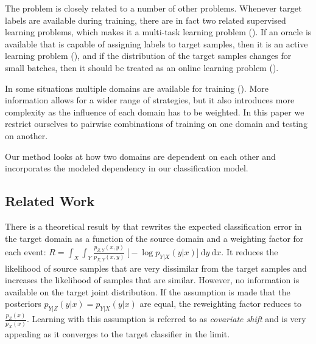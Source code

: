 \documentclass[twoside,11pt]{article}
\begin{document}
The problem is closely related to a number of other problems. Whenever target labels are available during training, there are in fact two related supervised learning problems, which makes it a multi-task learning problem (\citealp{pan2010survey, moreno2012unifying}). If an oracle is available that is capable of assigning labels to target samples, then it is an active learning problem (\citealp{cohn1996active}), and if the distribution of the target samples changes for small batches, then it should be treated as an online learning problem (\citealp{ma2009identifying}). 

In some situations multiple domains are available for training (\citealp{mansour2009domaina}). More information allows for a wider range of strategies, but it also introduces more complexity as the influence of each domain has to be weighted. In this paper we restrict ourselves to pairwise combinations of training on one domain and testing on another.

Our method looks at how two domains are dependent on each other and incorporates the modeled dependency in our classification model.

\subsection{Related Work}


There is a theoretical result by \cite{shimodaira2000improving} that rewrites the expected classification error in the target domain as a function of the source domain and a weighting factor for each event: $R= \int_{X} \int_{Y} \frac{p_{Z,Y}(x,y)}{p_{X,Y}(x,y)} \ \big[-\log p_{Y|X}(y|x)\big] \ \mathrm{d}y \ \mathrm{d}x$. It reduces the likelihood of source samples that are very dissimilar from the target samples and increases the likelihood of samples that are similar. However, no information is available on the target joint distribution. If the assumption is made that the posteriors $p_{Y|Z}(y|x)=p_{Y|X}(y|x)$ are equal, the reweighting factor reduces to $\frac{p_{Z}(x)}{p_{X}(x)}$. Learning with this assumption is referred to as \emph{covariate shift} and is very appealing as it converges to the target classifier in the limit. 
\end{document}
